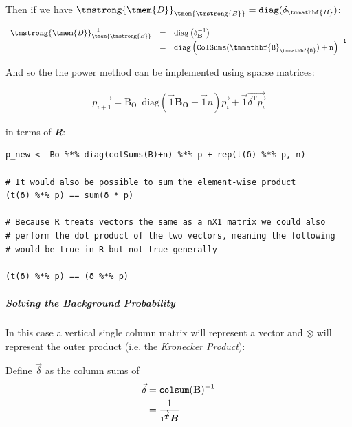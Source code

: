 \documentclass[11pt]{article}
\begin{document}
Then if we have \(\mathit{{\tmstrong{{\tmem{D}}}}}_{\mathit{{\tmem{{\tmstrong{B}}}}}} =
\mathtt{diag} (\delta_{\tmmathbf{B}}) \mathtt{}\):


\[ \begin{array}{lll}
     \mathit{{\tmstrong{{\tmem{D}}}}}_{\mathit{{\tmem{{\tmstrong{B}}}}}}^{- 1}
     & = & \mathrm{diag} \left( \delta^{- 1}_{\mathbf{B}} \right)\\
     & = & \mathtt{diag} \left( \mathtt{ColSums}
     (\mathtt{\tmmathbf{B}_{\tmmathbf{O}}}) + \mathtt{n}
     \right)^{\mathtt{- 1}}
   \end{array} \]

And so the the power method can be implemented using sparse matrices:

\begin{align}
\vec{p_{i+1}} = \mathrm{B_{O}} \enspace \mathrm{diag}\left( \vec{1} \mathbf{B_{O}} + \vec{1}n \right) \vec{p_{i}} + \vec{1} \vec{\delta^{\mathrm{T}}\vec{p_{i}}}
\end{align}

in terms of \textbf{\emph{R}}:

\lstset{language=r,label= ,caption= ,captionpos=b,numbers=none}
\begin{lstlisting}
p_new <- Bo %*% diag(colSums(B)+n) %*% p + rep(t(δ) %*% p, n)

# It would also be possible to sum the element-wise product
(t(δ) %*% p) == sum(δ * p)

# Because R treats vectors the same as a nX1 matrix we could also
# perform the dot product of the two vectors, meaning the following
# would be true in R but not true generally

(t(δ) %*% p) == (δ %*% p)
\end{lstlisting}


\subparagraph{Solving the Background Probability}
\label{solve-background-prob-power-walk-sparse}
In this case a vertical single column matrix will represent a vector and \(\otimes\) will represent the outer product (i.e. the \emph{Kronecker Product}):



Define \(\vec{\delta}\) as the column sums of
\[\begin{aligned}
     \vec{\delta} & = \mathtt{colsum} (\text{{\bfseries{B}}})^{- 1}\\
     & = \frac{1}{\overrightarrow{1^{{\scriptsize \ensuremath{\boldsymbol{T}}}}}
     \ensuremath{\boldsymbol{B}}}
   \end{aligned}\]
\end{document}
